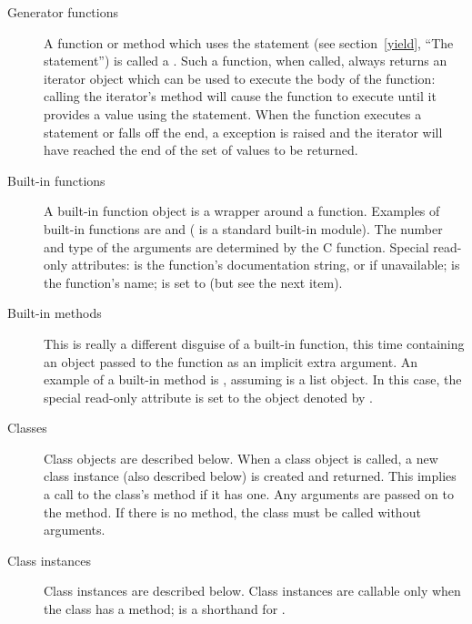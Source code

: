 \begin{description}
\begin{description}
\item[Generator functions]
A function or method which uses the  statement (see
section~\ref{yield}, ``The  statement'') is called a
.  Such a function, when called, always
returns an iterator object which can be used to execute the body of
the function:  calling the iterator's  method will
cause the function to execute until it provides a value using the
 statement.  When the function executes a
 statement or falls off the end, a
 exception is raised and the iterator will
have reached the end of the set of values to be returned.

\item[Built-in functions]
A built-in function object is a wrapper around a \C{} function.  Examples
of built-in functions are  and 
( is a standard built-in module).
The number and type of the arguments are
determined by the C function.
Special read-only attributes:  is the function's
documentation string, or  if unavailable; 
is the function's name;  is set to  (but see
the next item).

\item[Built-in methods]
This is really a different disguise of a built-in function, this time
containing an object passed to the \C{} function as an implicit extra
argument.  An example of a built-in method is
, assuming
 is a list object.
In this case, the special read-only attribute  is set
to the object denoted by .

\item[Classes]
Class objects are described below.  When a class object is called,
a new class instance (also described below) is created and
returned.  This implies a call to the class's  method
if it has one.  Any arguments are passed on to the 
method.  If there is no  method, the class must be called
without arguments.

\item[Class instances]
Class instances are described below.  Class instances are callable
only when the class has a  method; 
is a shorthand for .


\end{description}
\end{description}
